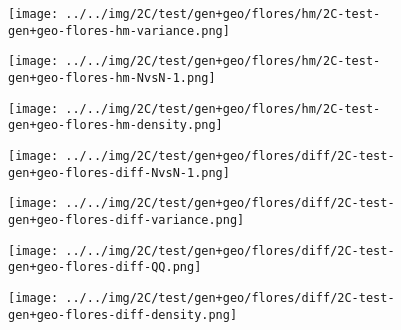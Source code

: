 \begin{figure}[H]
\centering	\texttt{[image: ../../img/2C/test/gen+geo/flores/hm/2C-test-gen+geo-flores-hm-variance.png]}
\end{figure}
\begin{figure}[H]
\centering	\texttt{[image: ../../img/2C/test/gen+geo/flores/hm/2C-test-gen+geo-flores-hm-NvsN-1.png]}
\end{figure}
\begin{figure}[H]
\centering	\texttt{[image: ../../img/2C/test/gen+geo/flores/hm/2C-test-gen+geo-flores-hm-density.png]}
\end{figure}
\begin{figure}[H]
\centering	\texttt{[image: ../../img/2C/test/gen+geo/flores/diff/2C-test-gen+geo-flores-diff-NvsN-1.png]}
\end{figure}
\begin{figure}[H]
\centering	\texttt{[image: ../../img/2C/test/gen+geo/flores/diff/2C-test-gen+geo-flores-diff-variance.png]}
\end{figure}
\begin{figure}[H]
\centering	\texttt{[image: ../../img/2C/test/gen+geo/flores/diff/2C-test-gen+geo-flores-diff-QQ.png]}
\end{figure}
\begin{figure}[H]
\centering	\texttt{[image: ../../img/2C/test/gen+geo/flores/diff/2C-test-gen+geo-flores-diff-density.png]}
\end{figure}
